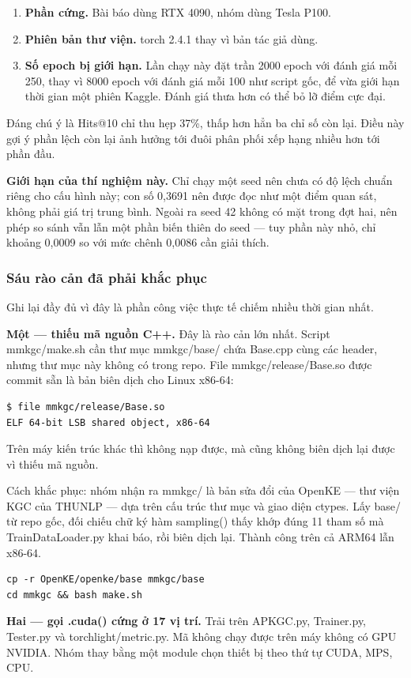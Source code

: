 \documentclass[11pt,a4paper]{article}
\newcommand{\code}[1]{{\ttfamily\small\color{codetext}#1}}
\begin{document}
\begin{enumerate}\itemsep2pt
\item \textbf{Phần cứng.} Bài báo dùng RTX 4090, nhóm dùng Tesla P100.
\item \textbf{Phiên bản thư viện.} torch 2.4.1 thay vì bản tác giả dùng.
\item \textbf{Số epoch bị giới hạn.} Lần chạy này đặt trần 2000 epoch với đánh giá mỗi 250, thay vì 8000 epoch với đánh giá mỗi 100 như script gốc, để vừa giới hạn thời gian một phiên Kaggle. Đánh giá thưa hơn có thể bỏ lỡ điểm cực đại.
\end{enumerate}
Đáng chú ý là Hits@10 chỉ thu hẹp 37\%, thấp hơn hẳn ba chỉ số còn lại. Điều này gợi ý phần lệch còn lại ảnh hưởng tới đuôi phân phối xếp hạng nhiều hơn tới phần đầu.

\textbf{Giới hạn của thí nghiệm này.} Chỉ chạy một seed nên chưa có độ lệch chuẩn riêng cho cấu hình này; con số 0,3691 nên được đọc như một điểm quan sát, không phải giá trị trung bình. Ngoài ra seed 42 không có mặt trong đợt hai, nên phép so sánh vẫn lẫn một phần biến thiên do seed --- tuy phần này nhỏ, chỉ khoảng 0,0009 so với mức chênh 0,0086 cần giải thích.

\subsubsection{Sáu rào cản đã phải khắc phục}
Ghi lại đầy đủ vì đây là phần công việc thực tế chiếm nhiều thời gian nhất.

\textbf{Một --- thiếu mã nguồn C++.} Đây là rào cản lớn nhất. Script \code{mmkgc/make.sh} cần thư mục \code{mmkgc/base/} chứa \code{Base.cpp} cùng các header, nhưng thư mục này không có trong repo. File \code{mmkgc/release/Base.so} được commit sẵn là bản biên dịch cho Linux x86-64:

\begin{lstlisting}
$ file mmkgc/release/Base.so
ELF 64-bit LSB shared object, x86-64
\end{lstlisting}
Trên máy kiến trúc khác thì không nạp được, mà cũng không biên dịch lại được vì thiếu mã nguồn.

Cách khắc phục: nhóm nhận ra \code{mmkgc/} là bản sửa đổi của OpenKE --- thư viện KGC của THUNLP --- dựa trên cấu trúc thư mục và giao diện \code{ctypes}. Lấy \code{base/} từ repo gốc, đối chiếu chữ ký hàm \code{sampling()} thấy khớp đúng 11 tham số mà \code{TrainDataLoader.py} khai báo, rồi biên dịch lại. Thành công trên cả ARM64 lẫn x86-64.

\begin{lstlisting}
cp -r OpenKE/openke/base mmkgc/base
cd mmkgc && bash make.sh
\end{lstlisting}
\textbf{Hai --- gọi \code{.cuda()} cứng ở 17 vị trí.} Trải trên \code{APKGC.py}, \code{Trainer.py}, \code{Tester.py} và \code{torchlight/metric.py}. Mã không chạy được trên máy không có GPU NVIDIA. Nhóm thay bằng một module chọn thiết bị theo thứ tự CUDA, MPS, CPU.
\end{document}
